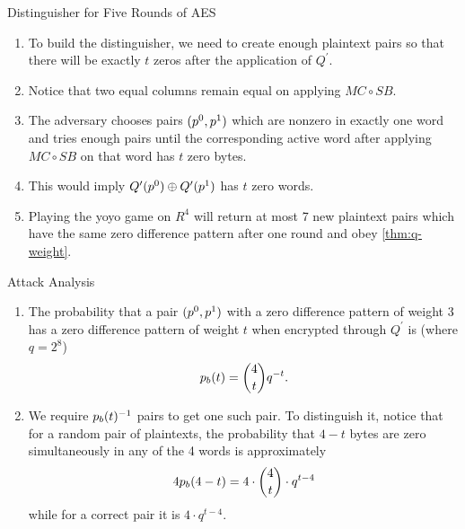 \documentclass[notheorems]{beamer}
\theoremstyle{definition}
\theoremstyle{example}
\begin{document}
    \begin{frame}{Distinguisher for Five Rounds of AES}
        \begin{enumerate}
            \item<1-> To build the distinguisher, we need to create enough
            plaintext pairs so that there will be exactly \(t\) zeros after the
            application of \(Q^\prime\). 
            \item<2-> Notice that two equal columns remain equal on applying
            \(MC \circ SB\). 
            \item<3-> The adversary chooses pairs \((p^0, p^1)\) which are
            nonzero in exactly one word and tries enough pairs until the
            corresponding active word after applying \(MC \circ SB\) on that
            word has \(t\) zero bytes. 
            \item<4-> This would imply \(Q^\prime(p^0) \oplus
            Q^\prime(p^1)\) has \(t\) zero words. 
            \item<5-> Playing the yoyo game on \(R^4\) will return at most 7 new
            plaintext pairs which have the same zero difference pattern after
            one round and obey \cref{thm:q-weight}.
        \end{enumerate}
    \end{frame}

    \begin{frame}{Attack Analysis}
        \begin{enumerate}
            \item<1-> The probability that a pair \((p^0, p^1)\) with a
            zero difference pattern of weight 3 has a zero difference pattern of
            weight \(t\) when encrypted through \(Q^\prime\) is (where \(q =
            2^8\))
            \begin{equation}
                p_b(t) = \binom{4}{t}q^{-t}.
            \end{equation}
            \item<2-> We require \(p_b(t)^{-1}\) pairs to get one such
            pair. To distinguish it, notice that for a random pair of
            plaintexts, the probability that \(4 - t\) bytes are zero
            simultaneously in any of the 4 words is approximately
            \begin{equation}
                4p_b(4 - t) = 4 \cdot \binom{4}{t} \cdot q^{t - 4}
            \end{equation}
            while for a correct pair it is \(4 \cdot q^{t - 4}\). 
        \end{enumerate}
    \end{frame}
\end{document}
